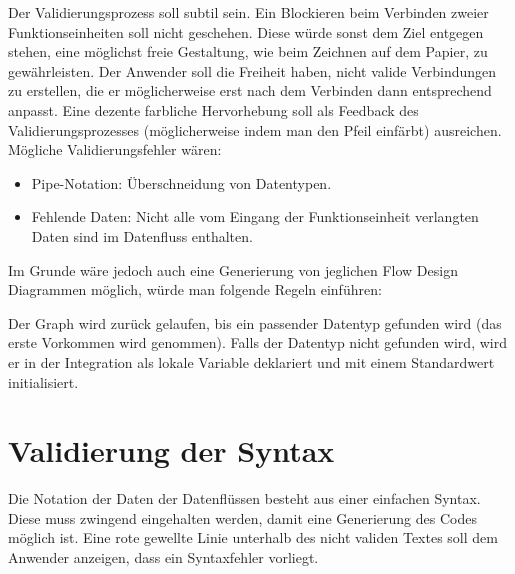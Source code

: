 Der Validierungsprozess soll subtil sein. Ein Blockieren beim Verbinden zweier Funktionseinheiten soll nicht geschehen. Diese würde sonst dem Ziel entgegen stehen,
eine möglichst freie Gestaltung, wie beim Zeichnen auf dem Papier, zu
gewährleisten. Der Anwender soll die Freiheit haben, nicht valide Verbindungen
zu erstellen, die er möglicherweise erst nach dem Verbinden dann entsprechend
anpasst. Eine dezente farbliche Hervorhebung soll als Feedback des
Validierungsprozesses (möglicherweise indem man den Pfeil einfärbt) ausreichen. Mögliche Validierungsfehler wären:
\begin{itemize}
\item Pipe-Notation: Überschneidung von Datentypen.
\item Fehlende Daten: Nicht alle vom Eingang der Funktionseinheit verlangten Daten
sind im Datenfluss enthalten.
\end{itemize}

Im Grunde wäre jedoch auch eine Generierung von jeglichen Flow Design Diagrammen
möglich, würde man folgende Regeln einführen:

Der Graph wird zurück gelaufen, bis ein passender Datentyp
gefunden wird (das erste Vorkommen wird genommen). Falls der Datentyp nicht
gefunden wird, wird er in der Integration als lokale Variable deklariert und mit einem Standardwert initialisiert.


\section{Validierung der Syntax}

Die Notation der Daten der Datenflüssen besteht aus einer einfachen Syntax. Diese muss zwingend eingehalten
 werden, damit eine Generierung des Codes möglich ist.
 Eine rote gewellte Linie unterhalb des nicht validen Textes soll dem Anwender
 anzeigen, dass ein Syntaxfehler vorliegt.

